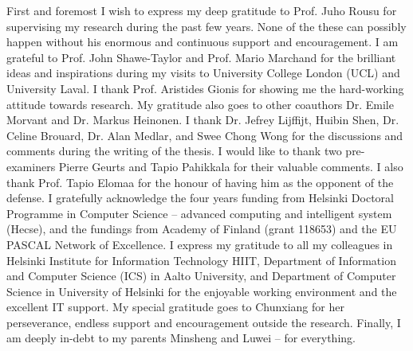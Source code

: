 

\begin{preface}[Espoo]

%
First and foremost I wish to express my deep gratitude to Prof. Juho Rousu for supervising my research during the past few years.
None of the these can possibly happen without his enormous and continuous support and encouragement.
%
I am grateful to Prof. John Shawe-Taylor and Prof. Mario Marchand for the brilliant ideas and inspirations during my visits to University College London (UCL) and University Laval.
%
I thank Prof. Aristides Gionis for showing me the hard-working attitude towards research.
My gratitude also goes to other coauthors Dr. Emile Morvant and Dr. Markus Heinonen. 
%
I thank Dr. Jefrey Lijffijt, Huibin Shen, Dr. Celine Brouard, Dr. Alan Medlar, and Swee Chong Wong for the discussions and comments during the writing of the thesis.
I would like to thank two pre-examiners Pierre Geurts and Tapio Pahikkala for their valuable comments.
I also thank Prof. Tapio Elomaa for the honour of having him as the opponent of the defense.
%
I gratefully acknowledge the four years funding from Helsinki Doctoral Programme in Computer Science -- advanced computing and intelligent system (Hecse), and the fundings from Academy of Finland (grant 118653) and the EU PASCAL Network of Excellence.
% 
I express my gratitude to all my colleagues in Helsinki Institute for Information Technology HIIT, Department of Information and Computer Science (ICS) in Aalto University, and Department of Computer Science in University of Helsinki for the enjoyable working environment and the excellent IT support.
%
My special gratitude goes to Chunxiang for her perseverance, endless support and encouragement outside the research.
%
Finally, I am deeply in-debt to my parents Minsheng and Luwei -- for everything.





\end{preface}
